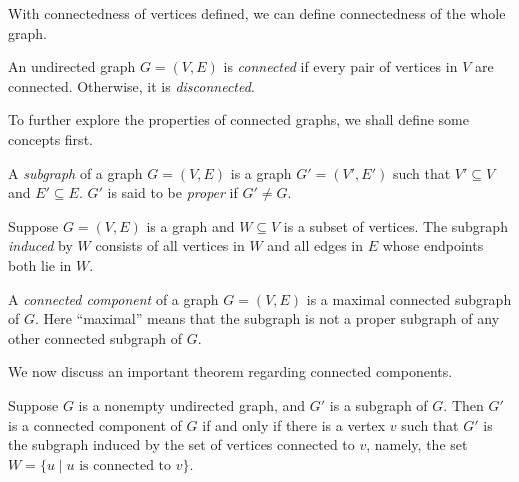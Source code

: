 With connectedness of vertices defined, we can define connectedness of the whole graph.

\begin{definition}
    An undirected graph $G=(V,E)$ is \emph{connected} if every pair of vertices in $V$ are connected. Otherwise, it is \emph{disconnected}.
\end{definition}

To further explore the properties of connected graphs, we shall define some concepts first. 

\begin{definition}[Subgraph]
     A \emph{subgraph} of a graph $G=(V,E)$ is a graph $G'=(V',E')$ such that $V'\subseteq V$ and $E'\subseteq E$. $G'$ is said to be \emph{proper} if $G'\neq G$. 
\end{definition}

\begin{definition}
    Suppose $G=(V,E)$ is a graph and $W\subseteq V$ is a subset of vertices. The subgraph \emph{induced} by $W$ consists of all vertices in $W$ and all edges in $E$ whose endpoints both lie in $W$. 
\end{definition}

\begin{definition}
    A \emph{connected component} of a graph $G=(V,E)$ is a maximal connected subgraph of $G$. Here ``maximal'' means that the subgraph is not a proper subgraph of any other connected subgraph of $G$.
\end{definition}

We now discuss an important theorem regarding connected components.

\begin{theorem}\label{thm:theorem about connected components}
    Suppose $G$ is a nonempty undirected graph, and $G'$ is a subgraph of $G$. Then $G'$ is a connected component of $G$ if and only if there is a vertex $v$ such that $G'$ is the subgraph induced by the set of vertices connected to $v$, namely, the set $W=\{u\mid u\text{ is connected to }v\}$. 
\end{theorem}

